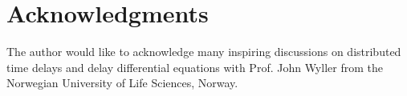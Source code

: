 \section*{Acknowledgments}
The author would like to acknowledge many inspiring discussions on distributed time delays and delay differential equations with Prof. John Wyller from the Norwegian University of Life Sciences, Norway.
